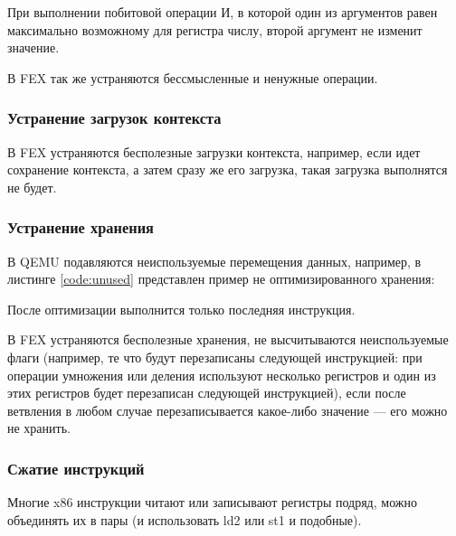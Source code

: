 При выполнении побитовой операции И, в которой один из аргументов равен максимально возможному для регистра числу, второй аргумент не изменит значение.

В FEX так же устраняются бессмысленные и ненужные операции.

\subsubsection{Устранение загрузок контекста}

В FEX устраняются бесполезные загрузки контекста, например, если идет сохранение контекста, а затем сразу же его загрузка, такая загрузка выполнятся не будет. 

\subsubsection{Устранение хранения}

В QEMU подавляются неиспользуемые перемещения данных, например, в листинге \ref{code:unused} представлен пример не оптимизированного хранения:


После оптимизации выполнится только последняя инструкция.

В FEX устраняются бесполезные хранения, не высчитываются неиспользуемые флаги (например, те что будут перезаписаны следующей инструкцией: при операции умножения или деления используют несколько регистров и один из этих регистров будет перезаписан следующей инструкцией), если после ветвления в любом случае перезаписывается какое-либо значение --- его можно не хранить.

\subsubsection{Сжатие инструкций}

Многие x86 инструкции читают или записывают регистры подряд, можно объединять их в пары (и использовать ld2 или st1 и подобные).


